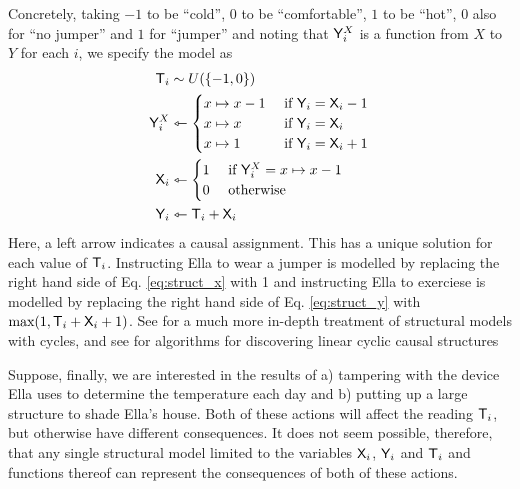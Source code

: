 \begin{example}
Concretely, taking $-1$ to be ``cold'', $0$ to be ``comfortable'', $1$ to be ``hot'', $0$ also for ``no jumper'' and $1$ for ``jumper'' and noting that $\mathsf{Y}^X_i$ is a function from $X$ to $Y$ for each $i$, we specify the model as
\begin{align}
    \mathsf{T}_i &\sim U(\{-1,0\})\\
    \mathsf{Y}^X_i &\leftarrowtriangle \begin{cases}
                                x\mapsto x-1 & \text{ if } \mathsf{Y}_i = \mathsf{X}_i -1\\
                                x\mapsto x & \text{ if } \mathsf{Y}_i = \mathsf{X}_i\\
                                x\mapsto 1 & \text{ if } \mathsf{Y}_i = \mathsf{X}_i+1
                            \end{cases}\\
    \mathsf{X}_i &\leftarrowtriangle \begin{cases}
                    1 &\text{ if }\mathsf{Y}^X_i=x\mapsto x-1\\
                    0 &\text{ otherwise}
    \end{cases}\label{eq:struct_x}\\
    \mathsf{Y}_i &\leftarrowtriangle \mathsf{T}_i + \mathsf{X}_i\label{eq:struct_y}
\end{align}
Here, a left arrow indicates a causal assignment. This has a unique solution for each value of $\mathsf{T}_i$. Instructing Ella to wear a jumper is modelled by replacing the right hand side of Eq. \eqref{eq:struct_x} with 1 and instructing Ella to exerciese is modelled by replacing the right hand side of  Eq. \eqref{eq:struct_y} with $\text{max}(1,\mathsf{T}_i + \mathsf{X}_i + 1)$. See \citet{bongers_theoretical_2016,forre_causal_2020} for a much more in-depth treatment of structural models with cycles, and see \citet{eberhardt_combining_2010,ghassami_causal_2020} for algorithms for discovering linear cyclic causal structures

Suppose, finally, we are interested in the results of a) tampering with the device Ella uses to determine the temperature each day and b) putting up a large structure to shade Ella's house. Both of these actions will affect the reading $\mathsf{T}_i$, but otherwise have different consequences. It does not seem possible, therefore, that any single structural model limited to the variables $\mathsf{X}_i$, $\mathsf{Y}_i$ and $\mathsf{T}_i$ and functions thereof can represent the consequences of both of these actions.
\end{example}

